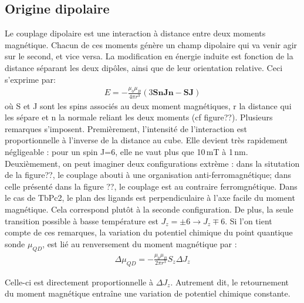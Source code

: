 \subsection{Origine dipolaire}
Le couplage dipolaire est une interaction à distance entre deux moments magnétique. Chacun de ces moments génère un champ dipolaire qui va venir agir sur le second, et vice versa. La modification en énergie induite est fonction de la distance séparant les deux dipôles, ainsi que de leur orientation relative. Ceci s'exprime par:
\begin{eqnarray}
E = -\frac{\mu_0 \mu_B}{4\pi r^3}(3\mathbf{SnJn} - \mathbf{SJ}) \nonumber
\end{eqnarray}
où S et J sont les spins associés au deux moment magnétiques, r la distance qui les sépare et n la normale reliant les deux moments (cf figure??). Plusieurs remarques s'imposent. Premièrement, l'intensité de l'interaction est proportionnelle à l'inverse de la distance au cube. Elle devient très rapidement négligeable : pour un spin J=6, elle ne vaut plus que 10\,mT à 1\,nm. Deuxièmement, on peut imaginer deux configurations extrème : dans la situtation de la figure??, le couplage abouti à une organisation anti-ferromagnétique; dans celle présenté dans la figure ??, le couplage est au contraire ferromgnétique. Dans le cas de TbPc2, le plan des ligands est perpendiculaire à l'axe facile du moment magnétique. Cela correspond plutôt à la seconde configuration. De plus, la seule transition possible à basse température est $J_z=\pm6 \rightarrow J_z \mp 6$. Si l'on tient compte de ces remarques, la variation du potentiel chimique du point quantique sonde $\mu_{QD}$, est lié au renversement du moment magnétique par :
\begin{eqnarray}
\Delta \mu_{QD} = -\frac{\mu_0 \mu_B}{2\pi r^3}S_z\Delta J_z\nonumber
\end{eqnarray}

Celle-ci est directement proportionnelle à $\Delta J_z$. Autrement dit, le retournement du moment magnétique entraîne une variation de potentiel chimique constante.

